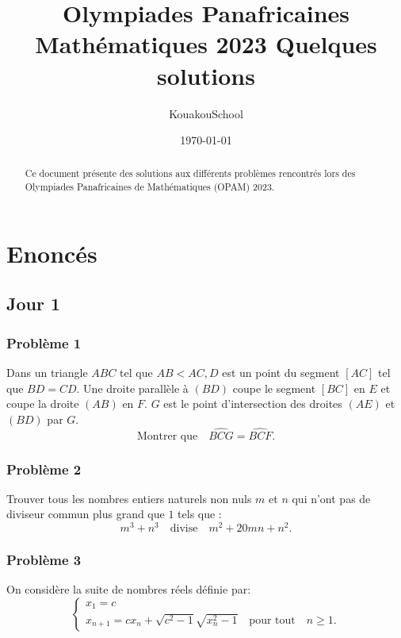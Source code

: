 \documentclass[12pt,a4paper,article]{memoir}
\title{Olympiades Panafricaines Mathématiques 2023 \newline Quelques solutions}
\author{KouakouSchool}
\date{\today} %
\begin{document}
\maketitle
\tableofcontents

\vspace{3 cm}

\begin{abstract}
Ce document présente des solutions aux différents problèmes rencontrés lors des Olympiades Panafricaines de Mathématiques (OPAM) 2023.
\end{abstract}

\chapter{Enoncés}
\section{Jour 1}
\subsection{Problème 1}
Dans un triangle  $ABC$ tel que $AB < AC, D$ est un point du segment $[AC]$ tel que $BD=CD$. Une droite parallèle à $(BD)$ coupe le segment
 $[BC]$ en  $E$ et coupe la droite  $(AB)$ en  $F$.  $G$ est le point d'intersection des droites  $(AE)$ et  $(BD)$ par  $G$. 
 \begin{equation}
 \textrm{Montrer que} \quad  \widehat{BCG} = \widehat{BCF}.
 \label{question-pb-1}
 \end{equation}
 
\subsection{Problème 2}
Trouver tous les nombres entiers naturels non nuls $m$ et $n$ qui n'ont pas de diviseur commun plus grand que $1$ tels que :
\begin{equation}
m^3 + n^3 \quad \textrm{divise} \quad m^2 + 20mn + n^2.
\label{equation-pb-2}
\end{equation}

\subsection{Problème 3}
On considère la suite de nombres réels définie par: 
\begin{equation}
\left\{
	\begin{array}{l}
	x_1 = c \\
	x_{n+1} = cx_{n} + \sqrt{c^2 - 1}\sqrt{x_{n}^2 - 1}  \quad \textrm{pour tout} \quad n \geq 1.
	\end{array}
\right.
\label{equation-pb-3}
\end{equation}
\end{document}
